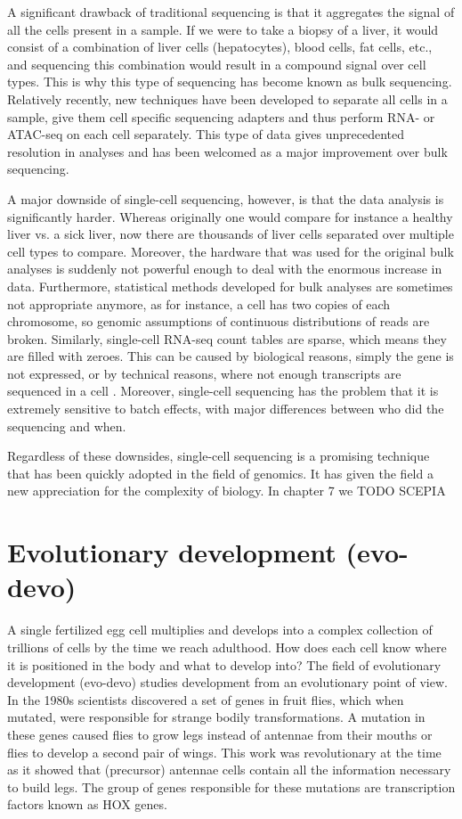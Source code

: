 A significant drawback of traditional sequencing is that it aggregates the signal of all the cells present in a sample. If we were to take a biopsy of a liver, it would consist of a combination of liver cells (hepatocytes), blood cells, fat cells, etc., and sequencing this combination would result in a compound signal over cell types. This is why this type of sequencing has become known as bulk sequencing. Relatively recently, new techniques have been developed to separate all cells in a sample, give them cell specific sequencing adapters and thus perform RNA- or ATAC-seq on each cell separately\cite{Buenrostro2015_sc,Tang2009}. This type of data gives unprecedented resolution in analyses and has been welcomed as a major improvement over bulk sequencing.

A major downside of single-cell sequencing, however, is that the data analysis is significantly harder. Whereas originally one would compare for instance a healthy liver vs. a sick liver, now there are thousands of liver cells separated over multiple cell types to compare. Moreover, the hardware that was used for the original bulk analyses is suddenly not powerful enough to deal with the enormous increase in data. Furthermore, statistical methods developed for bulk analyses are sometimes not appropriate anymore, as for instance, a cell has two copies of each chromosome, so genomic assumptions of continuous distributions of reads are broken. Similarly, single-cell RNA-seq count tables are sparse, which means they are filled with zeroes. This can be caused by biological reasons, simply the gene is not expressed, or by technical reasons, where not enough transcripts are sequenced in a cell \cite{Jiang2022}. Moreover, single-cell sequencing has the problem that it is extremely sensitive to batch effects, with major differences between who did the sequencing and when.

Regardless of these downsides, single-cell sequencing is a promising technique that has been quickly adopted in the field of genomics. It has given the field a new appreciation for the complexity of biology. In chapter 7 we TODO SCEPIA

\section{Evolutionary development (evo-devo)}

A single fertilized egg cell multiplies and develops into a complex collection of trillions of cells by the time we reach adulthood. How does each cell know where it is positioned in the body and what to develop into? The field of evolutionary development (evo-devo) studies development from an evolutionary point of view. In the 1980s scientists discovered a set of genes in fruit flies, which when mutated, were responsible for strange bodily transformations. A mutation in these genes caused flies to grow legs instead of antennae from their mouths\cite{Schneuwly1987} or flies to develop a second pair of wings\cite{Weatherbee1998}. This work was revolutionary at the time as it showed that (precursor) antennae cells contain all the information necessary to build legs. The group of genes responsible for these mutations are transcription factors known as HOX genes.

